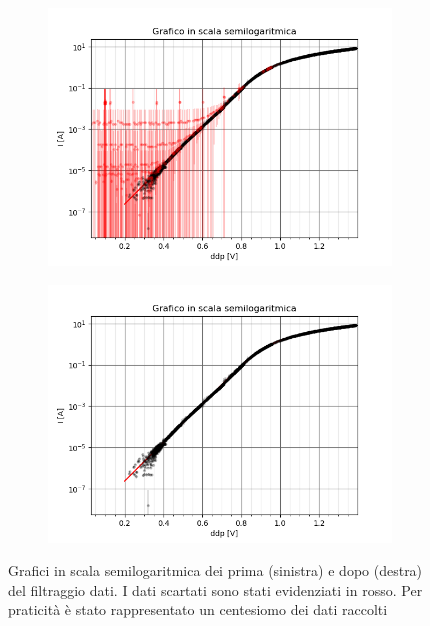 \documentclass{article}[a4paper, oneside, 11pt]
\begin{document}
\begin{figure}[H]
\centering
\begin{subfigure}{.5\textwidth}
	\centering 
 		\includegraphics[scale=0.5]{./nofilter.png}
	\label{fig: nofilter}
\end{subfigure}%
\begin{subfigure}{.5\textwidth}
	\centering 
 		\includegraphics[scale=0.5]{./filtered.png}
	\label{fig: filtered}
\end{subfigure}
	\caption{Grafici in scala semilogaritmica dei prima (sinistra) e dopo 
(destra) del filtraggio dati. I dati scartati sono stati evidenziati in rosso. 
Per praticità è stato rappresentato un centesiomo dei dati raccolti}
\end{figure}
\end{document}
